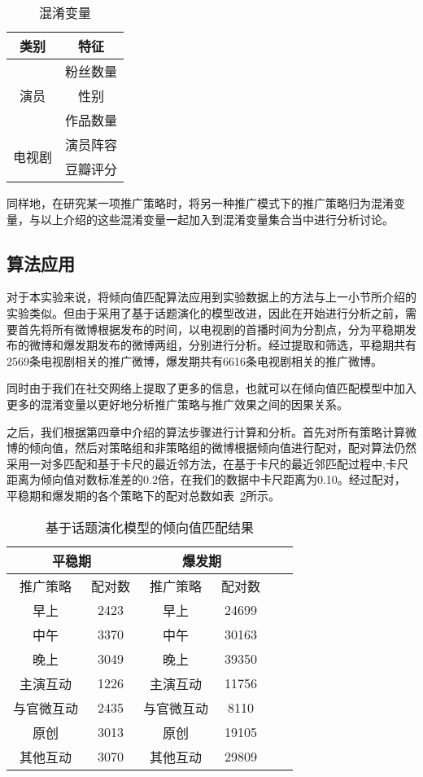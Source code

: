 \begin{table}[!htbp]
\centering
\caption{混淆变量}
\label{mul}
\begin{tabular}{|c|c|} \hline
类别 & 特征\\ \hline
\multirow{3}{*}{演员} & 粉丝数量\\%
& 性别\\%
& 作品数量\\ \hline
\multirow{2}{*}{电视剧} & 演员阵容\\%
&豆瓣评分 \\ \hline
\end{tabular}
\end{table}

同样地，在研究某一项推广策略时，将另一种推广模式下的推广策略归为混淆变量，与以上介绍的这些混淆变量一起加入到混淆变量集合当中进行分析讨论。

\subsection{算法应用}

对于本实验来说，将倾向值匹配算法应用到实验数据上的方法与上一小节所介绍的实验类似。但由于采用了基于话题演化的模型改进，因此在开始进行分析之前，需要首先将所有微博根据发布的时间，以电视剧的首播时间为分割点，分为平稳期发布的微博和爆发期发布的微博两组，分别进行分析。经过提取和筛选，平稳期共有2569条电视剧相关的推广微博，爆发期共有6616条电视剧相关的推广微博。

同时由于我们在社交网络上提取了更多的信息，也就可以在倾向值匹配模型中加入更多的混淆变量以更好地分析推广策略与推广效果之间的因果关系。

之后，我们根据第四章中介绍的算法步骤进行计算和分析。首先对所有策略计算微博的倾向值，然后对策略组和非策略组的微博根据倾向值进行配对，配对算法仍然采用一对多匹配和基于卡尺的最近邻方法，在基于卡尺的最近邻匹配过程中,卡尺距离为倾向值对数标准差的$0.2$倍，在我们的数据中卡尺距离为0.10。经过配对，平稳期和爆发期的各个策略下的配对总数如表~\ref{pair}所示。

\begin{table}[!htbp]
\centering
\caption{基于话题演化模型的倾向值匹配结果}
\label{pair}
\begin{tabular}{|c|c|c|c|c|c|} \hline
\multicolumn{2}{|c|}{平稳期}& \multicolumn{2}{c|}{爆发期}\\ \hline
推广策略 & 配对数& 推广策略 & 配对数\\ \hline
早上 & 2423& 早上 & 24699\\%
中午 & 3370 & 中午 & 30163\\%
晚上 & 3049 & 晚上 & 39350\\ \hline
主演互动 & 1226 &  主演互动 & 11756\\
与官微互动& 2435 & 与官微互动 & 8110\\%
原创& 3013 & 原创& 19105\\
其他互动& 3070 & 其他互动 & 29809\\ \hline
\end{tabular}
\end{table}

